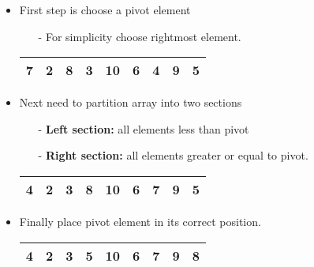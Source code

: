 \documentclass[a4paper,12pt]{article}
\begin{document}
\begin{itemize}[leftmargin=*]
\item First step is choose a pivot element
  \begin{itemize}
  \item[-] For simplicity choose rightmost element.
  \end{itemize}
  
\begin{center}
\begin{tabular}{|c|c|c|c|c|c|c|c|c|}
\hline
7 & 2 & 8 & 3 & 10 & 6 & 4 & 9 & 5 \\
\hline
\end{tabular}
\end{center}

\item Next need to partition array into two sections
\begin{itemize}
  \item[-] \textbf{Left section:} all elements less than pivot
  \item[-] \textbf{Right section:} all elements greater or equal to pivot.
\end{itemize}

\begin{center}
\begin{tabular}{|c|c|c|c|c|c|c|c|c|}
\hline
4 & 2 & 3 & 8 & 10 & 6 & 7 & 9 & 5 \\
\hline
\end{tabular}
\end{center}

\item Finally place pivot element in its correct position.

\begin{center}
\begin{tabular}{|c|c|c|c|c|c|c|c|c|}
\hline
4 & 2 & 3 & 5 & 10 & 6 & 7 & 9 & 8 \\
\hline
\end{tabular}
\end{center}
\end{itemize}


\vspace{1cm}
\end{document}
